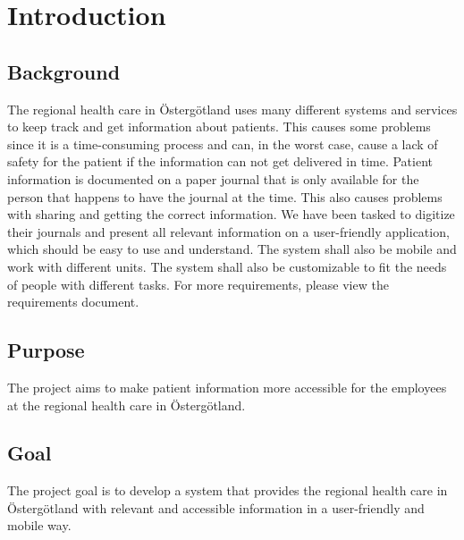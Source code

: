 \section{Introduction}
\label{sec:introduction}

\subsection{Background}
\label{sec:background}

The regional health care in Östergötland uses many different systems and services to keep track and get information about patients. This causes some problems since it is a time-consuming process and can, in the worst case, cause a lack of safety for the patient if the information can not get delivered in time. Patient information is documented on a paper journal that is only available for the person that happens to have the journal at the time. This also causes problems with sharing and getting the correct information. We have been tasked to digitize their journals and present all relevant information on a user-friendly application, which should be easy to use and understand. The system shall also be mobile and work with different units. The system shall also be customizable to fit the needs of people with different tasks. For more requirements, please view the requirements document. 

\subsection{Purpose}
\label{sec:purpose}

The project aims to make patient information more accessible for the employees at the regional health care in Östergötland.

\subsection{Goal}
\label{sec:goal}

The project goal is to develop a system that provides the regional health care in Östergötland with relevant and accessible information in a user-friendly and mobile way.


